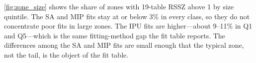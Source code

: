 \documentclass[review]{elsarticle}
\begin{document}

%
%

%
%

\cref{fig:zone_size}
shows the share of zones with 19-table RSSZ above 1 by size quintile. The SA
and MIP fits stay at or below 3\% in every class, so they do not concentrate
poor fits in large zones. The IPU fits are higher---about 9--11\% in Q1 and
Q5---which is the same fitting-method gap the fit table reports. The differences
among the SA and MIP fits are small enough that the typical zone, not the tail,
is the object of the fit table.
\end{document}
